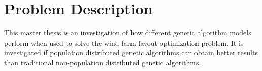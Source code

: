 \section*{Problem Description}
This master thesis is an investigation of how different genetic algorithm models perform when used to solve the wind farm layout optimization problem. It is investigated if population distributed genetic algorithms can obtain better results than traditional non-population distributed genetic algorithms. 

\newpage